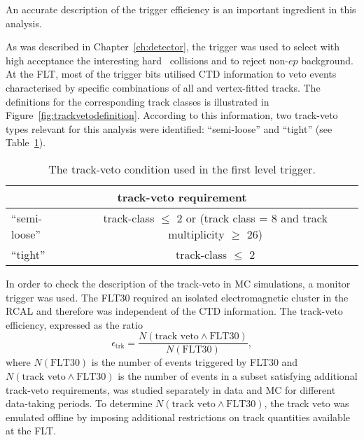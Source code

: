 An accurate description of the trigger efficiency is an important ingredient in this analysis.

As was described in Chapter~\ref{ch:detector}, the \zeus trigger was used to select with high acceptance the interesting hard \ep~collisions and to reject non-$ep$ background. At the FLT, most of the trigger bits utilised CTD information to veto events characterised by specific combinations of all and vertex-fitted tracks. The definitions for the corresponding track classes is illustrated in Figure~\ref{fig:trackvetodefinition}. According to this information, two track-veto types relevant for this analysis were identified: ``semi-loose'' and ``tight'' (see Table~\ref{tab:trackveto}). 
\textcolor{blue}{
\begin{table}[htpb]
 \centering
 \begin{tabular}{lc}
 \multicolumn{2}{c}{track-veto requirement} \\
  \hline
 ``semi-loose'' & track-class $\le$ 2 or (track class = 8 and track multiplicity $\ge$ 26) \\
 ``tight''      & track-class $\le$ 2 \\
 \end{tabular} 
\caption{The track-veto condition used in the first level trigger.}
\label{tab:trackveto}
\end{table} 
}
In order to check the description of the track-veto in MC simulations, a monitor trigger was used. The FLT30 required an isolated electromagnetic cluster in the RCAL and therefore was independent of the CTD information. The track-veto efficiency, expressed as the ratio
\begin{equation}
 \epsilon_\mathrm{trk} = \frac{N\left(\text{track veto} \wedge \text{FLT30}\right)}{N\left(\text{FLT30}\right)},
\end{equation}
where $N\left(\text{FLT30}\right)$ is the number of events triggered by FLT30 and $N\left(\text{track veto} \wedge \text{FLT30}\right)$ is the number of events in a subset satisfying additional track-veto requirements, was studied separately in data and MC for different data-taking periods. To determine $N\left(\text{track veto} \wedge \text{FLT30}\right)$, the track veto was emulated offline by imposing additional restrictions on track quantities available at the FLT.

